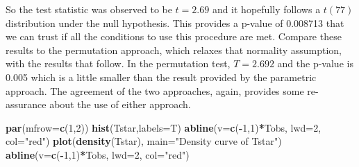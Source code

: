 \documentclass[]{book}
\newenvironment{Shaded}{\begin{snugshade}}{\end{snugshade}}
\newcommand{\KeywordTok}[1]{\textcolor[rgb]{0.13,0.29,0.53}{\textbf{#1}}}
\newcommand{\DataTypeTok}[1]{\textcolor[rgb]{0.13,0.29,0.53}{#1}}
\newcommand{\DecValTok}[1]{\textcolor[rgb]{0.00,0.00,0.81}{#1}}
\newcommand{\StringTok}[1]{\textcolor[rgb]{0.31,0.60,0.02}{#1}}
\newcommand{\OtherTok}[1]{\textcolor[rgb]{0.56,0.35,0.01}{#1}}
\newcommand{\ControlFlowTok}[1]{\textcolor[rgb]{0.13,0.29,0.53}{\textbf{#1}}}
\newcommand{\OperatorTok}[1]{\textcolor[rgb]{0.81,0.36,0.00}{\textbf{#1}}}
\newcommand{\NormalTok}[1]{#1}
\begin{document}
So the test statistic was observed to be \(t=2.69\) and it hopefully
follows a \(t(77)\) distribution under the null hypothesis. This
provides a p-value of 0.008713 that we can trust if all the conditions
to use this procedure are met. Compare these results to the permutation
approach, which relaxes that normality assumption, with the results that
follow. In the permutation test, \(T=2.692\) and the p-value is 0.005
which is a little smaller than the result provided by the parametric
approach. The agreement of the two approaches, again, provides some
re-assurance about the use of either approach.

\begin{Shaded}
\end{Shaded}




\begin{Shaded}
\begin{Highlighting}[]
\KeywordTok{par}\NormalTok{(}\DataTypeTok{mfrow=}\KeywordTok{c}\NormalTok{(}\DecValTok{1}\NormalTok{,}\DecValTok{2}\NormalTok{))}
\KeywordTok{hist}\NormalTok{(Tstar,}\DataTypeTok{labels=}\NormalTok{T)}
\KeywordTok{abline}\NormalTok{(}\DataTypeTok{v=}\KeywordTok{c}\NormalTok{(}\OperatorTok{-}\DecValTok{1}\NormalTok{,}\DecValTok{1}\NormalTok{)}\OperatorTok{*}\NormalTok{Tobs, }\DataTypeTok{lwd=}\DecValTok{2}\NormalTok{, }\DataTypeTok{col=}\StringTok{"red"}\NormalTok{)}
\KeywordTok{plot}\NormalTok{(}\KeywordTok{density}\NormalTok{(Tstar), }\DataTypeTok{main=}\StringTok{"Density curve of Tstar"}\NormalTok{)}
\KeywordTok{abline}\NormalTok{(}\DataTypeTok{v=}\KeywordTok{c}\NormalTok{(}\OperatorTok{-}\DecValTok{1}\NormalTok{,}\DecValTok{1}\NormalTok{)}\OperatorTok{*}\NormalTok{Tobs, }\DataTypeTok{lwd=}\DecValTok{2}\NormalTok{, }\DataTypeTok{col=}\StringTok{"red"}\NormalTok{)}
\end{Highlighting}
\end{Shaded}
\end{document}
